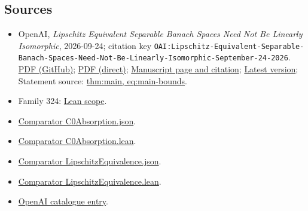 \documentclass[11pt]{article}
\begin{document}
\subsection{Sources}
\begin{itemize}
\item OpenAI, \emph{Lipschitz Equivalent Separable Banach Spaces Need Not Be Linearly Isomorphic}, 2026-09-24; citation key \texttt{OAI:Lipschitz-Equivalent-Separable-Banach-Spaces-Need-Not-Be-Linearly-Isomorphic-September-24-2026}. \href{https://github.com/openai/math/blob/adc7f1241b42e322a6451854ab7e4b4c146bf78a/preprints/Lipschitz-Equivalent-Separable-Banach-Spaces-Need-Not-Be-Linearly-Isomorphic-September-24-2026/paper.pdf}{PDF (GitHub)}; \href{https://github.com/openai/math/raw/adc7f1241b42e322a6451854ab7e4b4c146bf78a/preprints/Lipschitz-Equivalent-Separable-Banach-Spaces-Need-Not-Be-Linearly-Isomorphic-September-24-2026/paper.pdf}{PDF (direct)}; \href{https://github.com/openai/math/blob/adc7f1241b42e322a6451854ab7e4b4c146bf78a/preprints/Lipschitz-Equivalent-Separable-Banach-Spaces-Need-Not-Be-Linearly-Isomorphic-September-24-2026/README.md}{Manuscript page and citation}; \href{https://github.com/openai/math/blob/main/preprints/Lipschitz-Equivalent-Separable-Banach-Spaces-Need-Not-Be-Linearly-Isomorphic-September-24-2026/paper.pdf}{Latest version}; Statement source: \href{https://github.com/openai/math/blob/adc7f1241b42e322a6451854ab7e4b4c146bf78a/preprints/Lipschitz-Equivalent-Separable-Banach-Spaces-Need-Not-Be-Linearly-Isomorphic-September-24-2026/build/sections/01-introduction.tex\#L21}{thm:main, eq:main-bounds}.
\item Family 324: \href{https://github.com/openai/math/blob/adc7f1241b42e322a6451854ab7e4b4c146bf78a/lean/docs/324.md}{Lean scope}.
\item \href{https://github.com/openai/math/blob/adc7f1241b42e322a6451854ab7e4b4c146bf78a/lean/ComparatorChallenges/C0Absorption.json}{Comparator C0Absorption.json}.
\item \href{https://github.com/openai/math/blob/adc7f1241b42e322a6451854ab7e4b4c146bf78a/lean/ComparatorChallenges/C0Absorption.lean}{Comparator C0Absorption.lean}.
\item \href{https://github.com/openai/math/blob/adc7f1241b42e322a6451854ab7e4b4c146bf78a/lean/ComparatorChallenges/LipschitzEquivalence.json}{Comparator LipschitzEquivalence.json}.
\item \href{https://github.com/openai/math/blob/adc7f1241b42e322a6451854ab7e4b4c146bf78a/lean/ComparatorChallenges/LipschitzEquivalence.lean}{Comparator LipschitzEquivalence.lean}.
\item \href{https://github.com/openai/math/blob/adc7f1241b42e322a6451854ab7e4b4c146bf78a/CONTENTS.md}{OpenAI catalogue entry}.
\end{itemize}
\end{document}

